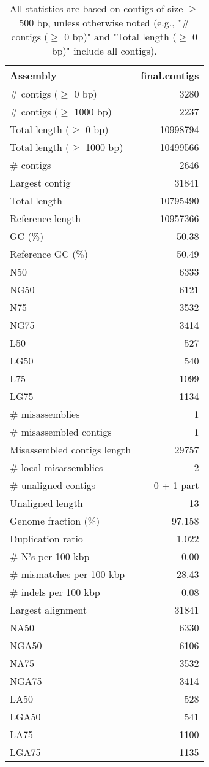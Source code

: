 \documentclass[12pt,a4paper]{article}
\begin{document}
\begin{table}[ht]
\begin{center}
\caption{All statistics are based on contigs of size $\geq$ 500 bp, unless otherwise noted (e.g., "\# contigs ($\geq$ 0 bp)" and "Total length ($\geq$ 0 bp)" include all contigs).}
\begin{tabular}{|l*{1}{|r}|}
\hline
Assembly & final.contigs \\ \hline
\# contigs ($\geq$ 0 bp) & 3280 \\ \hline
\# contigs ($\geq$ 1000 bp) & 2237 \\ \hline
Total length ($\geq$ 0 bp) & 10998794 \\ \hline
Total length ($\geq$ 1000 bp) & 10499566 \\ \hline
\# contigs & 2646 \\ \hline
Largest contig & 31841 \\ \hline
Total length & 10795490 \\ \hline
Reference length & 10957366 \\ \hline
GC (\%) & 50.38 \\ \hline
Reference GC (\%) & 50.49 \\ \hline
N50 & 6333 \\ \hline
NG50 & 6121 \\ \hline
N75 & 3532 \\ \hline
NG75 & 3414 \\ \hline
L50 & 527 \\ \hline
LG50 & 540 \\ \hline
L75 & 1099 \\ \hline
LG75 & 1134 \\ \hline
\# misassemblies & 1 \\ \hline
\# misassembled contigs & 1 \\ \hline
Misassembled contigs length & 29757 \\ \hline
\# local misassemblies & 2 \\ \hline
\# unaligned contigs & 0 + 1 part \\ \hline
Unaligned length & 13 \\ \hline
Genome fraction (\%) & 97.158 \\ \hline
Duplication ratio & 1.022 \\ \hline
\# N's per 100 kbp & 0.00 \\ \hline
\# mismatches per 100 kbp & 28.43 \\ \hline
\# indels per 100 kbp & 0.08 \\ \hline
Largest alignment & 31841 \\ \hline
NA50 & 6330 \\ \hline
NGA50 & 6106 \\ \hline
NA75 & 3532 \\ \hline
NGA75 & 3414 \\ \hline
LA50 & 528 \\ \hline
LGA50 & 541 \\ \hline
LA75 & 1100 \\ \hline
LGA75 & 1135 \\ \hline
\end{tabular}
\end{center}
\end{table}
\end{document}
